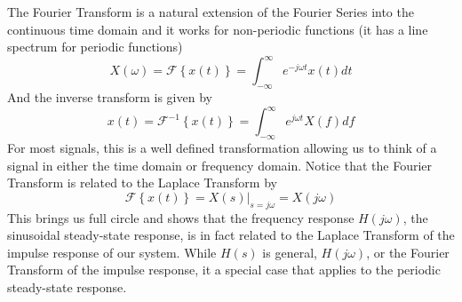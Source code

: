 The Fourier Transform is a natural extension of the Fourier Series into the continuous time domain and it works for non-periodic functions (it has a line spectrum for periodic functions)
    \begin{equation}
        X(\omega)  = \mathcal{F} \left\{ x(t) \right\} =  \int_{-\infty}^{\infty} e^{-j \omega t} x(t) dt
    \end{equation}
And the inverse transform is given by
    \begin{equation}
        x(t) =  \mathcal{F}^{-1} \left\{ x(t) \right\} = \int_{-\infty}^{\infty} e^{j \omega t} X(f) df
    \end{equation}
For most signals, this is a well defined transformation allowing us to think of a signal in either the time domain or frequency domain. Notice that the Fourier Transform is related to the Laplace Transform by
    \begin{equation}
        \mathcal{F} \left\{ x(t) \right\}  = \left. X(s) \right|_{s = j\omega}  = X(j\omega)
    \end{equation}
This brings us full circle and shows that the frequency response $H(j\omega)$, the sinusoidal steady-state response, is in fact related to the Laplace Transform of the impulse response of our system.  While $H(s)$ is general, $H(j\omega)$, or the Fourier Transform of the impulse response, it a special case that applies to the periodic steady-state response.  
